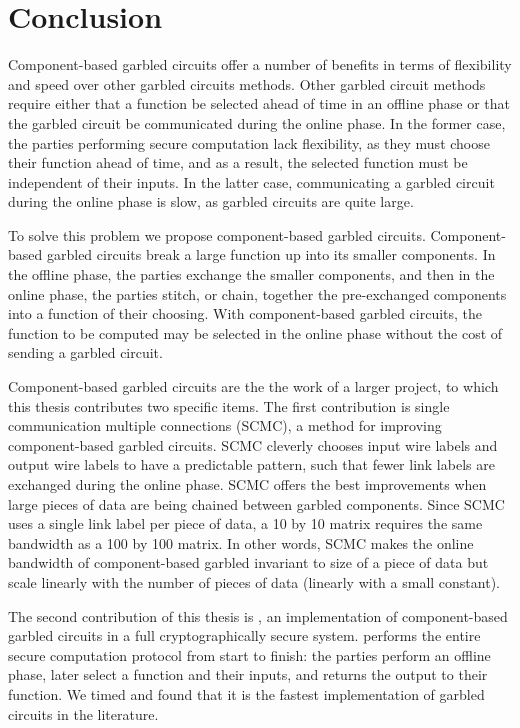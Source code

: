 
\chapter*{Conclusion}
	\setcounter{chapter}{4}
	\setcounter{section}{0}

Component-based garbled circuits offer a number of benefits in terms of flexibility and speed over other garbled circuits methods.
Other garbled circuit methods require either that a function be selected ahead of time in an offline phase or that the garbled circuit be communicated during the online phase.
In the former case, the parties performing secure computation lack flexibility, as they must choose their function ahead of time, and as a result, the selected function must be independent of their inputs.
In the latter case, communicating a garbled circuit during the online phase is slow, as garbled circuits are quite large.

To solve this problem we propose component-based garbled circuits.
Component-based garbled circuits break a large function up into its smaller components.
In the offline phase, the parties exchange the smaller components, and then in the online phase, the parties stitch, or chain, together the pre-exchanged components into a function of their choosing.
With component-based garbled circuits, the function to be computed may be selected in the online phase without the cost of sending a garbled circuit.

Component-based garbled circuits are the the work of a larger project, to which this thesis contributes two specific items. 
The first contribution is single communication multiple connections (SCMC), a method for improving component-based garbled circuits.
SCMC cleverly chooses input wire labels and output wire labels to have a predictable pattern, such that fewer link labels are exchanged during the online phase.
SCMC offers the best improvements when large pieces of data are being chained between garbled components.
Since SCMC uses a single link label per piece of data, a 10 by 10 matrix requires the same bandwidth as a 100 by 100 matrix.
In other words, SCMC makes the online bandwidth of component-based garbled invariant to size of a piece of data but scale linearly with the number of pieces of data (linearly with a small constant).

The second contribution of this thesis is \CompGC, an implementation of component-based garbled circuits in a full cryptographically secure system.
\CompGC performs the entire secure computation protocol from start to finish: the parties perform an offline phase, later select a function and their inputs, and \CompGC returns the output to their function. 
We timed \CompGC and found that it is the fastest implementation of garbled circuits in the literature.

